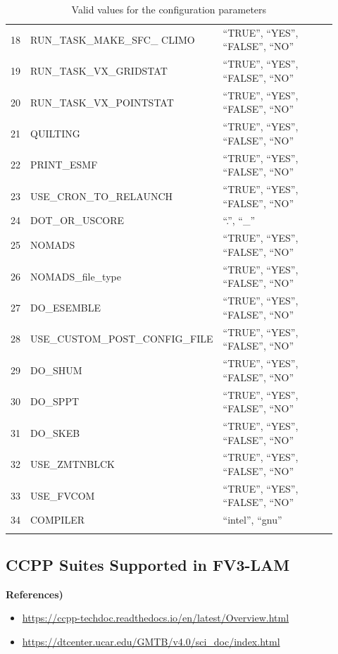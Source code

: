 \documentclass[11pt,fleqn]{report}              %
\begin{document}
{\begin{longtable}{p{0.02\linewidth} | p{0.3\linewidth} | p{0.6\linewidth} }
18 & RUN\_TASK\_MAKE\_SFC\_ CLIMO & ``TRUE'', ``YES'', ``FALSE'', ``NO'' \\
19 & RUN\_TASK\_VX\_GRIDSTAT & ``TRUE'', ``YES'', ``FALSE'', ``NO'' \\
20 & RUN\_TASK\_VX\_POINTSTAT & ``TRUE'', ``YES'', ``FALSE'', ``NO'' \\
21 & QUILTING & ``TRUE'', ``YES'', ``FALSE'', ``NO'' \\
22 & PRINT\_ESMF & ``TRUE'', ``YES'', ``FALSE'', ``NO'' \\
23 & USE\_CRON\_TO\_RELAUNCH & ``TRUE'', ``YES'', ``FALSE'', ``NO'' \\
24 & DOT\_OR\_USCORE & ``.'', ``\_'' \\
25 & NOMADS & ``TRUE'', ``YES'', ``FALSE'', ``NO'' \\
26 & NOMADS\_file\_type & ``TRUE'', ``YES'', ``FALSE'', ``NO'' \\
27 & DO\_ESEMBLE & ``TRUE'', ``YES'', ``FALSE'', ``NO'' \\
28 & USE\_CUSTOM\_POST\_CONFIG\_FILE & ``TRUE'', ``YES'', ``FALSE'', ``NO'' \\
29 & DO\_SHUM & ``TRUE'', ``YES'', ``FALSE'', ``NO'' \\
30 & DO\_SPPT & ``TRUE'', ``YES'', ``FALSE'', ``NO'' \\
31 & DO\_SKEB & ``TRUE'', ``YES'', ``FALSE'', ``NO'' \\
32 & USE\_ZMTNBLCK & ``TRUE'', ``YES'', ``FALSE'', ``NO'' \\
33 & USE\_FVCOM & ``TRUE'', ``YES'', ``FALSE'', ``NO'' \\
34 & COMPILER & ``intel'', ``gnu'' \\
\hline
\caption{Valid values for the configuration parameters}
\label{table:config_validval}
\end{longtable}
}



\subsection{CCPP Suites Supported in FV3-LAM}
\label{subsec:ccpp_suites_kinds}

{\bf References)} 
\begin{itemize}
\item \url{https://ccpp-techdoc.readthedocs.io/en/latest/Overview.html} 
\item \url{https://dtcenter.ucar.edu/GMTB/v4.0/sci_doc/index.html}
\end{itemize}
\end{document}
